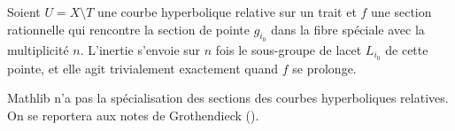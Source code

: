 \begin{encadre}
\begin{conjecture*}
Soient $U = X \setminus T$ une courbe hyperbolique relative sur un trait et $f$ une section rationnelle qui rencontre la section de pointe $g_{i_0}$ dans la fibre spéciale avec la multiplicité $n$. L'inertie s'envoie sur $n$ fois le sous-groupe de lacet $L_{i_0}$ de cette pointe, et elle agit trivialement exactement quand $f$ se prolonge.
\end{conjecture*}
\end{encadre}
{\small Mathlib n'a pas la spécialisation des sections des courbes hyperboliques relatives. On se reportera aux notes de Grothendieck ().\par}
